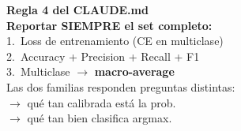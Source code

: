 \documentclass[10pt]{article}
\newcommand{\fb}[1]{{\color{label}\small #1}}
\begin{document}
\begin{minipage}[t]{0.36\textwidth}
\begin{tcolorbox}[colback=card, colframe=title, arc=3pt, boxrule=1.2pt,
                  left=8pt, right=8pt, top=4pt, bottom=4pt]
{\color{title}\textbf{Regla 4 del CLAUDE.md}}\\[4pt]
{\textbf{\color{text}Reportar SIEMPRE el set completo:}}\\[2pt]
\hspace{6pt}1.\ Loss de entrenamiento (CE en multiclase)\\
\hspace{6pt}2.\ Accuracy + Precision + Recall + F1\\
\hspace{6pt}3.\ Multiclase $\to$ {\color{title}\textbf{macro-average}}\\[6pt]
\fb{Las dos familias responden preguntas distintas:}\\[1pt]
 $\to$ qué tan calibrada está la prob.\\
 $\to$ qué tan bien clasifica argmax.
\end{tcolorbox}
\end{minipage}
\end{document}
